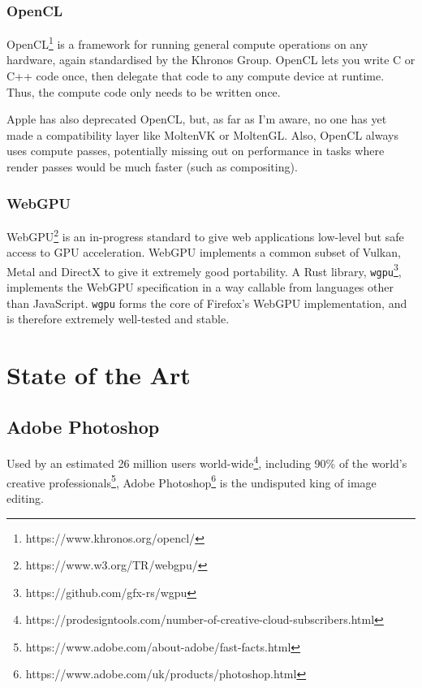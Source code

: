 \documentclass[12pt]{article}
\begin{document}
\subsubsection{OpenCL}\label{sec:open-cl}

OpenCL\footnote{https://www.khronos.org/opencl/} is a framework for running general compute
operations on any hardware, again standardised by the Khronos Group.  OpenCL lets you
write C or C++ code once, then delegate that code to any compute device at runtime.  Thus, the
compute code only needs to be written once.

Apple has also deprecated OpenCL, but, as far as I'm aware, no one has yet made a compatibility
layer like MoltenVK or MoltenGL.  Also, OpenCL always uses compute passes, potentially missing out
on performance in tasks where render passes would be much faster (such as compositing).

\subsubsection{WebGPU}

WebGPU\footnote{https://www.w3.org/TR/webgpu/} is an in-progress standard to give web applications
low-level but safe access to GPU acceleration.  WebGPU implements a common subset of Vulkan, Metal
and DirectX to give it extremely good portability.  A Rust library,
\verb|wgpu|\footnote{https://github.com/gfx-rs/wgpu}, implements the WebGPU specification in a way
callable from languages other than JavaScript.  \verb|wgpu| forms the core of Firefox's WebGPU
implementation, and is therefore extremely well-tested and stable.



\pagebreak

\section{State of the Art} %

\subsection{Adobe Photoshop}

Used by an estimated 26 million users
world-wide\footnote{https://prodesigntools.com/number-of-creative-cloud-subscribers.html}, including
90\% of the world's creative
professionals\footnote{https://www.adobe.com/about-adobe/fast-facts.html}, Adobe
Photoshop\footnote{https://www.adobe.com/uk/products/photoshop.html} is the
undisputed king of image editing.
\end{document}
